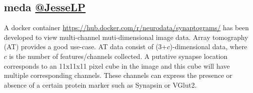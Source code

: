 \documentclass[simplex.tex]{subfiles}
\begin{document}
\subsection[meda]{meda \href{https://github.com/mrae}{@JesseLP}}

%
%
%
%


A docker container
\href{https://hub.docker.com/r/neurodata/synaptograms/}{https://hub.docker.com/r/neurodata/synaptograms/}
has been developed to view multi-channel
muti-dimensional image data.  Array tomography (AT) provides a good
use-case. AT data consist of (3+$c$)-dimensional data, where $c$ is the
number of features/channels collected. 
%
A putative synapse location corresponds to an 11x11x11
pixel cube in the image and this cube will have multiple corresponding
channels. These channels can express the presence or absence of a
certain protein marker such as Synapsin or VGlut2. 
\end{document}
